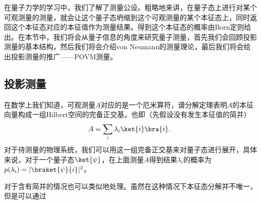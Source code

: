 

在量子力学的学习中，我们了解了测量公设。粗略地来讲，在量子态上进行对某个可观测量的测量，就会让这个量子态坍缩到这个可观测量的某个本征态上，同时返回这个本征态对应的本征值作为测量结果。得到这个本征态的概率由Born定则给出。在本节中，我们将会从量子信息的角度来研究量子测量，首先我们会回顾投影测量的基本结构，然后我们将会介绍von Neumann的测量理论，最后我们将会给出投影测量的推广——POVM测量。

\subsection{投影测量}

在数学上我们知道，可观测量$A$对应的是一个厄米算符，谱分解定理表明$A$的本征向量构成一组Hilbert空间的完备正交基，也即（先假设没有发生本征值的简并）
\begin{equation}
A=\sum_i\lambda_i\ket{i}\bra{i}.~
\end{equation}
对于待测量的物理系统，我们可以用这一组完备正交基来对量子态进行展开，具体来说，对于一个量子态$\ket{\psi}$，在上面测量$A$得到结果$\lambda_i$的概率为$p(\lambda_i)=|\braket{\psi}{i}|^2$。

对于含有简并的情况也可以类似地处理。虽然在这种情况下本征态分解并不唯一，但是可以通过

